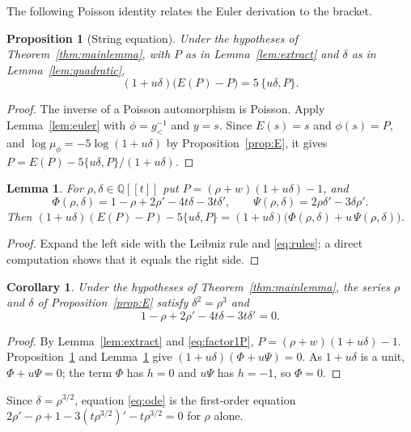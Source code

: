 \documentclass[11pt]{article}
\newtheorem{lemma}[theorem]{Lemma}
\newtheorem{proposition}[theorem]{Proposition}
\newtheorem{corollary}[theorem]{Corollary}
\theoremstyle{definition}
\theoremstyle{remark}
\numberwithin{equation}{section}
\newcommand{\Q}{\mathbb{Q}}
\newcommand{\ps}[1]{\Q[\![#1]\!]}
\newcommand{\gl}{g_{<}}
\begin{document}
The following Poisson identity relates the Euler derivation to the bracket.
\begin{proposition}[String equation]\label{prop:string}
Under the hypotheses of Theorem~\ref{thm:mainlemma}, with $P$ as in
Lemma~\ref{lem:extract} and $\delta$ as in Lemma~\ref{lem:quadratic},
\[
  (1+u\delta)\big(E(P)-P\big)=5\,\{u\delta,P\}.
\]
\end{proposition}

\begin{proof}
The inverse of a Poisson automorphism is Poisson. Apply
Lemma~\ref{lem:euler} with $\phi=\gl^{-1}$ and $y=s$. Since $E(s)=s$ and
$\phi(s)=P$, and $\log\mu_\phi=-5\log(1+u\delta)$ by
Proposition~\ref{prop:E}, it gives
$P=E(P)-5\{u\delta,P\}/(1+u\delta)$.
\end{proof}

\begin{lemma}\label{lem:exact}
For $\rho,\delta\in\ps{t}$ put $P=(\rho+w)(1+u\delta)-1$, and
\[
  \Phi(\rho,\delta)=1-\rho+2\rho'-4t\delta-3t\delta',\qquad
  \Psi(\rho,\delta)=2\rho\delta'-3\delta\rho' .
\]
Then $(1+u\delta)(E(P)-P)-5\{u\delta,P\}=(1+u\delta)\big(\Phi(\rho,\delta)+u\,\Psi(\rho,\delta)\big)$.
\end{lemma}

\begin{proof}
Expand the left side with the Leibniz rule and \eqref{eq:rules}; a
direct computation shows that it equals the right side.
\end{proof}



\begin{corollary}\label{cor:ode}
Under the hypotheses of Theorem~\ref{thm:mainlemma}, the series $\rho$ and
$\delta$ of Proposition~\ref{prop:E} satisfy $\delta^2=\rho^3$ and
\begin{equation}\label{eq:ode}
  1-\rho+2\rho'-4t\delta-3t\delta'=0 .
\end{equation}
\end{corollary}

\begin{proof}
By Lemma~\ref{lem:extract} and \eqref{eq:factor1P},
$P=(\rho+w)(1+u\delta)-1$. Proposition~\ref{prop:string} and
Lemma~\ref{lem:exact} give $(1+u\delta)(\Phi+u\Psi)=0$. As $1+u\delta$ is
a unit, $\Phi+u\Psi=0$; the term $\Phi$ has $h=0$ and $u\Psi$ has $h=-1$,
so $\Phi=0$.
\end{proof}

Since $\delta=\rho^{3/2}$, equation \eqref{eq:ode} is the first-order
equation $2\rho'-\rho+1-3(t\rho^{3/2})'-t\rho^{3/2}=0$ for $\rho$ alone.
\end{document}

